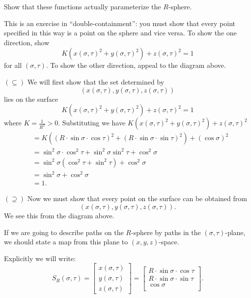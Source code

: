 \documentclass[newpage,hints,handout,noauthor,nooutcomes,12pt]{ximera}
\begin{document}
\begin{problem}
  Show that these functions actually parameterize the $R$-sphere.
\begin{hint}
This is an exercise in ``double-containment'': you must show that every point
specified in this way is a point on the sphere and vice versa.  To show the one
direction, show
\[
K\left(x(\sigma,\tau) ^{2}+y(\sigma,\tau) ^{2}\right) +z(\sigma,\tau)^{2} = 1
\]
for all $(\sigma,\tau)$. To show the other direction, appeal to the
diagram above.
\end{hint}
\begin{freeResponse}
  $(\subseteq)$ We will first show that the set determined by
  \[
  \left(x(\sigma,\tau), y(\sigma,\tau), z(\sigma,\tau)\right)
  \]
  lies on the surface
  \[
  K\left(x(\sigma,\tau) ^{2}+y(\sigma,\tau) ^{2}\right) +z(\sigma,\tau)^{2} = 1
  \]
  where $K=\frac{1}{R^2}>0$. Substituting we have
  $K\left(x(\sigma,\tau) ^{2}+y(\sigma,\tau) ^{2}\right)
  +z(\sigma,\tau)^{2}$
  \begin{align*}
    &=K\left((R\cdot\sin\sigma\cdot\cos\tau)^{2}+(R\cdot\sin\sigma\cdot\sin\tau)^{2}\right) +(\cos\sigma)^{2} \\
    &= \sin^2\sigma\cdot\cos^2\tau+\sin^2\sigma\sin^2\tau + \cos^2\sigma \\
    &= \sin^2\sigma(\cos^2\tau+\sin^2\tau) + \cos^2\sigma \\
    &= \sin^2\sigma + \cos^2\sigma \\
    &=1.
  \end{align*}

  $(\supseteq)$ Now we must show that every point on the surface can be obtained from
  \[
  \left(x(\sigma,\tau), y(\sigma,\tau), z(\sigma,\tau)\right).
  \]
  We see this from the diagram above. 
\end{freeResponse}
\end{problem}




If we are going to describe paths on the $R$-sphere by paths in the
$(\sigma,\tau)$-plane, we should state a map from this plane to
$(x,y,z)$-space.
\begin{center}
\end{center}
Explicitly we will write:
\[
S_R(\sigma,\tau) = 
\begin{bmatrix}
x(\sigma,\tau)  \\
y(\sigma,\tau)  \\
z(\sigma,\tau)  
\end{bmatrix}
=
\begin{bmatrix}
  R\cdot \sin\sigma\cdot \cos \tau  \\
  R\cdot \sin\sigma\cdot \sin\tau\\
  \cos \sigma \\
\end{bmatrix}.
\]
\end{document}
